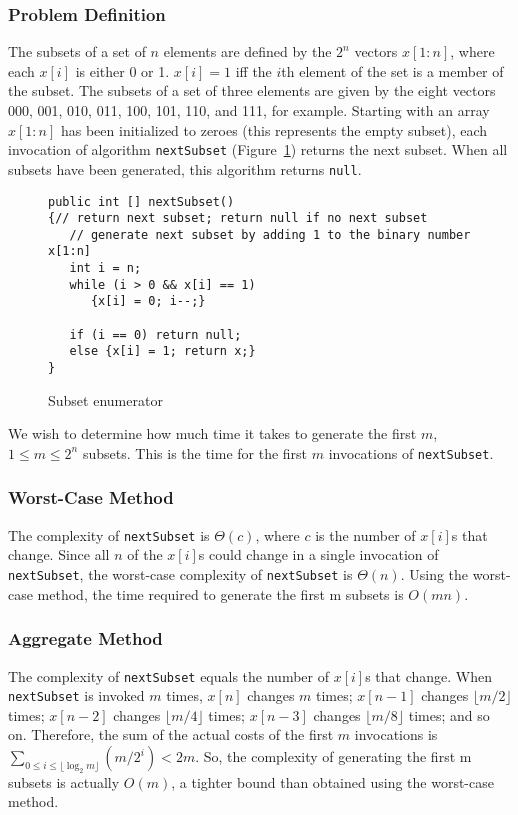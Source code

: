 \subsubsection*{Problem Definition}
The subsets of a set of $n$ elements are defined
by the $2^n$ vectors
$x[1:n]$, where each
$x[i]$ is either 0 or
1.
$x[i] = 1$ iff the
$i$th element of the set is a member of the
subset.  The subsets of a set of three elements are given by the
eight vectors 000, 001, 010, 011, 100, 101, 110, and 111,
for example.
Starting with an array $x[1:n]$ has been initialized to zeroes (this
represents the empty subset), each invocation of
algorithm {\tt nextSubset} (Figure~\ref{fig:enum})
returns the next subset. When all subsets have been generated, this
algorithm
returns {\tt null}.

\begin{figure}
\begin{verbatim}
public int [] nextSubset()
{// return next subset; return null if no next subset
   // generate next subset by adding 1 to the binary number x[1:n]
   int i = n;
   while (i > 0 && x[i] == 1)
      {x[i] = 0; i--;}

   if (i == 0) return null;
   else {x[i] = 1; return x;}
}
\end{verbatim}
\caption{Subset enumerator\label{fig:enum}}
\end{figure}

We wish to determine how much time it takes to generate the first
$m$, $1 \leq  m \leq 2^n$ subsets. This is the time for the first $m$
invocations of {\tt nextSubset}.

\subsubsection*{Worst-Case Method}
The complexity of {\tt nextSubset} is
$\Theta(c)$, where $c$
is the number of $x[i]$s that change.
Since all $n$ of the $x[i]$s
could change in a single invocation of {\tt nextSubset},
the worst-case complexity of {\tt nextSubset} is
$\Theta(n)$. Using the worst-case method, the
time required to generate the first m subsets
is $O(mn)$.

\subsubsection*{Aggregate Method}
The complexity of {\tt nextSubset} equals the number of
$x[i]$s that change.
When {\tt nextSubset} is invoked
$m$ times,
$x[n]$ changes $m$ times;
$x[n - 1]$ changes $\lfloor m/2\rfloor$
times;
$x[n - 2]$ changes $\lfloor m/4\rfloor$ times;
$x[n - 3]$ changes $\lfloor m/8\rfloor$ times;
and so on. Therefore, the sum of the actual costs of the first
$m$ invocations is
$\sum_{0 \leq i \leq \lfloor \log_2 m \rfloor} (m/2^i)
< 2m$.
So, the complexity of generating the first m
subsets is actually $O(m)$, a tighter bound than
obtained using the worst-case method.

